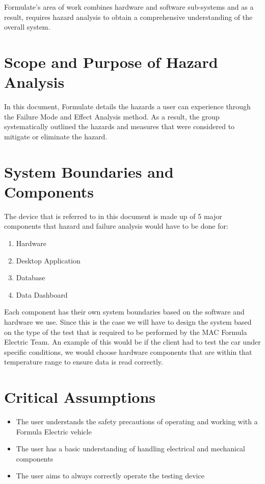 \documentclass[12pt]{article}
\begin{document}
Formulate's area of work combines hardware and software sub-systems and as a result, requires hazard analysis to obtain a comprehensive understanding of the overall system. 


\section{Scope and Purpose of Hazard Analysis}

In this document, Formulate details the hazards a user can experience through the Failure Mode and Effect Analysis method. As a result, the group systematically outlined the hazards and measures that were considered to mitigate or eliminate the hazard.

\section{System Boundaries and Components}

The device that is referred to in this document is made up of 5 major components that hazard and failure analysis would have to be done for:

\begin{enumerate}
\item Hardware
\item Desktop Application
\item Database
\item Data Dashboard 
\end{enumerate}

Each component has their own system boundaries based on the software and hardware we use. Since this is the case we will have to design the system based on the type of the test that is required to be performed by the MAC Formula Electric Team. An example of this would be if the client had to test the car under specific conditions, we would choose hardware components that are within that temperature range to ensure data is read correctly.

\newpage
\section{Critical Assumptions}

\begin{itemize}
	\item The user understands the safety precautions of operating and working with a Formula Electric vehicle
	\item The user has a basic understanding of handling electrical and mechanical components
	\item The user aims to always correctly operate the testing device
\end{itemize}
\end{document}
